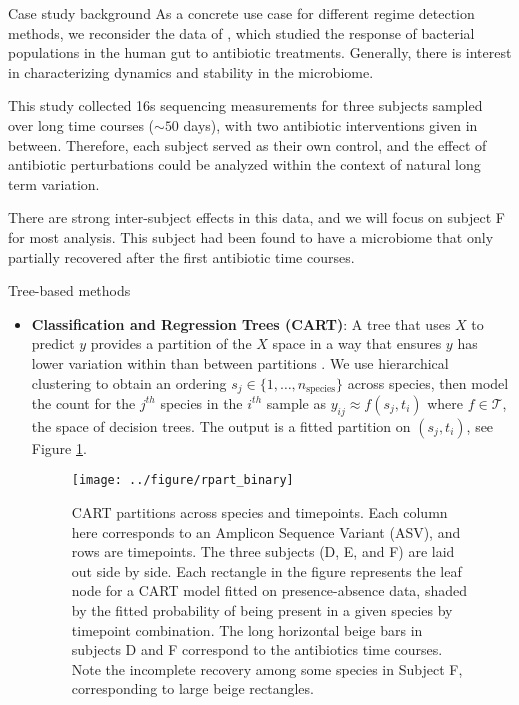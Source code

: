 \documentclass[final, 8pt]{beamer}
\newlength{\onecolwid}
\begin{document}
\begin{frame}
\begin{columns}
\begin{column}{\onecolwid}
\begin{block}{Case study background}
As a concrete use case for different regime detection methods, we reconsider the
data of \citep{dethlefsen2011incomplete}, which studied the response of
bacterial populations in the human gut to antibiotic treatments. Generally,
there is interest in characterizing dynamics and stability in the microbiome.

This study collected 16s sequencing measurements for three subjects sampled over
long time courses ($\sim 50$ days), with two antibiotic interventions given in
between. Therefore, each subject served as their own control, and the effect of
antibiotic perturbations could be analyzed within the context of natural long
term variation.

There are strong inter-subject effects in this data, and we will focus on
subject F for most analysis. This subject had been found to have a microbiome
that only partially recovered after the first antibiotic time courses.
\end{block}

\begin{block}{Tree-based methods}
\begin{itemize}
\item \textbf{Classification and Regression Trees (CART)}: A tree that uses $X$ to
  predict $y$ provides a partition of the $X$ space in a way that ensures $y$
  has lower variation within than between partitions
  \citep{breiman1984classification}. We use hierarchical clustering to obtain an
  ordering $s_{j} \in \{1, \dots, n_{\text{species}}\}$ across species, then
  model the count for the $j^{th}$ species in the $i^{th}$ sample as $y_{ij}
  \approx f\left(s_{j}, t_{i}\right)$ where $f \in \mathcal{T}$, the space of
  decision trees. The output is a fitted partition on $\left(s_{j},
  t_{i}\right)$, see Figure \ref{fig:rpart_binary}.

\begin{figure}[ht]
  \centering
  \texttt{[image: ../figure/rpart\_binary]}
  \caption{CART partitions across species and timepoints. Each column here
    corresponds to an Amplicon Sequence Variant (ASV), and rows are timepoints.
    The three subjects (D, E, and F) are laid out side by side. Each rectangle
    in the figure represents the leaf node for a CART model fitted on
    presence-absence data, shaded by the fitted probability of being present in
    a given species by timepoint combination. The long horizontal beige bars in
    subjects D and F correspond to the antibiotics time courses. Note the
    incomplete recovery among some species in Subject F, corresponding to large
    beige rectangles.
    \label{fig:rpart_binary}}
\end{figure}
\end{itemize}
\end{block}
\end{column}


\end{columns}
\end{frame}
\end{document}
